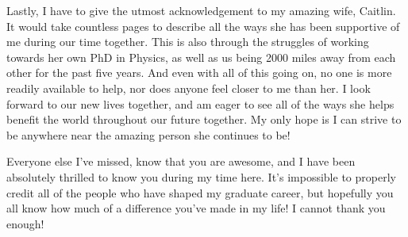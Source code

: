 Lastly, I have to give the utmost acknowledgement to my amazing wife, Caitlin.
It would take countless pages to describe all the ways she has been supportive of me during our time together.
This is also through the struggles of working towards her own PhD in Physics, as well as us being 2000 miles away from each other for the past five years.
And even with all of this going on, no one is more readily available to help, nor does anyone feel closer to me than her.
I look forward to our new lives together, and am eager to see all of the ways she helps benefit the world throughout our future together.
My only hope is I can strive to be anywhere near the amazing person she continues to be!

Everyone else I've missed, know that you are awesome, and I have been absolutely thrilled to know you during my time here.
It's impossible to properly credit all of the people who have shaped my graduate career, but hopefully you all know how much of a difference you've made in my life!
I cannot thank you enough!

